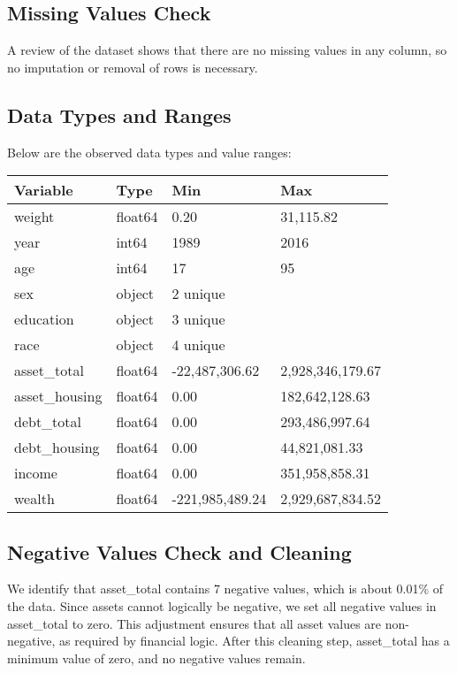 \documentclass[
  letterpaper,
  DIV=11,
  numbers=noendperiod]{scrartcl}
\begin{document}
\subsection{Missing Values Check}\label{missing-values-check}

A review of the dataset shows that there are no missing values in any
column, so no imputation or removal of rows is necessary.

\subsection{Data Types and Ranges}\label{data-types-and-ranges}

Below are the observed data types and value ranges:

\begin{longtable}[]{@{}llll@{}}
\toprule\noalign{}
Variable & Type & Min & Max \\
\midrule\noalign{}
\endhead
\bottomrule\noalign{}
\endlastfoot
weight & float64 & 0.20 & 31,115.82 \\
year & int64 & 1989 & 2016 \\
age & int64 & 17 & 95 \\
sex & object & 2 unique & \\
education & object & 3 unique & \\
race & object & 4 unique & \\
asset\_total & float64 & -22,487,306.62 & 2,928,346,179.67 \\
asset\_housing & float64 & 0.00 & 182,642,128.63 \\
debt\_total & float64 & 0.00 & 293,486,997.64 \\
debt\_housing & float64 & 0.00 & 44,821,081.33 \\
income & float64 & 0.00 & 351,958,858.31 \\
wealth & float64 & -221,985,489.24 & 2,929,687,834.52 \\
\end{longtable}

\subsection{Negative Values Check and
Cleaning}\label{negative-values-check-and-cleaning}

We identify that asset\_total contains 7 negative values, which is about
0.01\% of the data. Since assets cannot logically be negative, we set
all negative values in asset\_total to zero. This adjustment ensures
that all asset values are non-negative, as required by financial logic.
After this cleaning step, asset\_total has a minimum value of zero, and
no negative values remain.
\end{document}
